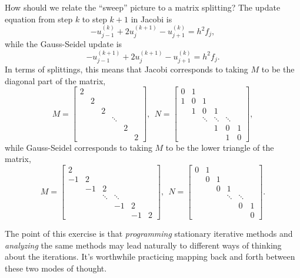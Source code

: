 \documentclass[12pt, leqno]{article}
\begin{document}
How should we relate the ``sweep'' picture to a matrix splitting?
The update equation from step $k$ to step $k+1$ in Jacobi is
\[
  -u_{j-1}^{(k)}+2u_j^{(k+1)}-u_{j+1}^{(k)} = h^2 f_j,
\]
while the Gauss-Seidel update is
\[
  -u_{j-1}^{(k+1)}+2u_j^{(k+1)}-u_{j+1}^{(k)} = h^2 f_j.
\]
In terms of splittings, this means that Jacobi corresponds to
taking $M$ to be the diagonal part of the matrix,
\[
M =
\begin{bmatrix}
   2 &    \\
     &  2 &    \\
     &    &  2 &    \\
     &    &        & \ddots &  \\
     &    &        &    & 2 &  \\
     &    &        &    &   & 2
\end{bmatrix}, ~~
N =
\begin{bmatrix}
   0 &  1 \\
   1 &  0 &  1 \\
     &  1 &  0 & 1 \\
     &    & \ddots & \ddots & \ddots \\
     &    &        & 1 & 0 & 1 \\
     &    &        &   & 1 & 0
\end{bmatrix},
\]
while Gauss-Seidel corresponds to taking $M$ to be the lower triangle
of the matrix,
\[
M =
\begin{bmatrix}
   2 &  \\
  -1 &  2 &  \\
     & -1 &  2 &  \\
     &    & \ddots & \ddots &  \\
     &    &        & -1 & 2 &  \\
     &    &        &    & -1 & 2
\end{bmatrix}, ~~
N =
\begin{bmatrix}
   0 &  1 \\
     &  0 &  1 \\
     &    &  0 & 1 \\
     &    &    & \ddots & \ddots \\
     &    &        &  & 0 & 1 \\
     &    &        &    &   & 0
\end{bmatrix}.
\]

The point of this exercise is that {\em programming} stationary
iterative methods and {\em analyzing} the same methods may lead
naturally to different ways of thinking about the iterations.
It's worthwhile practicing mapping back and forth between these
two modes of thought.
\end{document}
